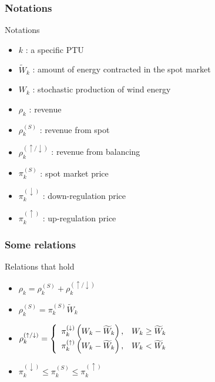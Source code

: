 \begin{frame}\frametitle{Notations}
  \begin{block}{Notations}
  \begin{itemize}
    \item $k$ : a specific PTU
    \item $\widetilde { W } _ { k }$ : amount of energy contracted in the spot market
    \item $W _ { k }$ : stochastic production of wind energy
    \item $\rho _ { k }$ : revenue
    \item $\rho _ { k } ^ { ( S ) }$ : revenue from spot
    \item $\rho _ { k } ^ { ( \uparrow / \downarrow ) }$ : revenue from balancing
    \item $\pi _ { k } ^ { ( S ) }$ : spot market price
    \item $\pi _ { k } ^ { ( \downarrow ) }$ : down-regulation price
    \item $\pi _ { k } ^ { ( \uparrow ) }$ : up-regulation price
  \end{itemize}
\end{block}

\end{frame}


\begin{frame}\frametitle{Some relations}
  \begin{block}{Relations that hold}

  \begin{itemize}
    \item $\rho _ { k } = \rho _ { k } ^ { ( S ) } + \rho _ { k } ^ { ( \uparrow / \downarrow ) }$
    \item $\rho _ { k } ^ { ( S ) } = \pi _ { k } ^ { ( S ) } \widetilde { W } _ { k }$
    \item $\rho _ { k } ^ { ( \uparrow / \downarrow ) } = \left\{ \begin{array} { l l } { \pi _ { k } ^ { ( \downarrow ) } \left( W _ { k } - \widetilde { W } _ { k } \right) , } & { W _ { k } \geq \widetilde { W } _ { k } } \\ { \pi _ { k } ^ { ( \uparrow ) } \left( W _ { k } - \widetilde { W } _ { k } \right) , } & { W _ { k } < \widetilde { W } _ { k } } \end{array} \right.$
    \item $\pi _ { k } ^ { ( \downarrow ) } \leq \pi _ { k } ^ { ( S ) }
    \leq \pi _ { k } ^ { ( \uparrow ) }$
  \end{itemize}
\end{block}

\end{frame}


